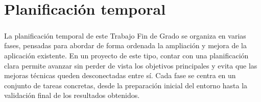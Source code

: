 \chapter{Planificación temporal}
\label{ch:definicion-del-problema}
\paragraph*{}La planificación temporal de este Trabajo Fin de Grado se organiza en varias fases, pensadas para abordar de forma ordenada la ampliación y mejora de la aplicación existente. En un proyecto de este tipo, contar con una planificación clara permite avanzar sin perder de vista los objetivos principales y evita que las mejoras técnicas queden desconectadas entre sí. Cada fase se centra en un conjunto de tareas concretas, desde la preparación inicial del entorno hasta la validación final de los resultados obtenidos.


